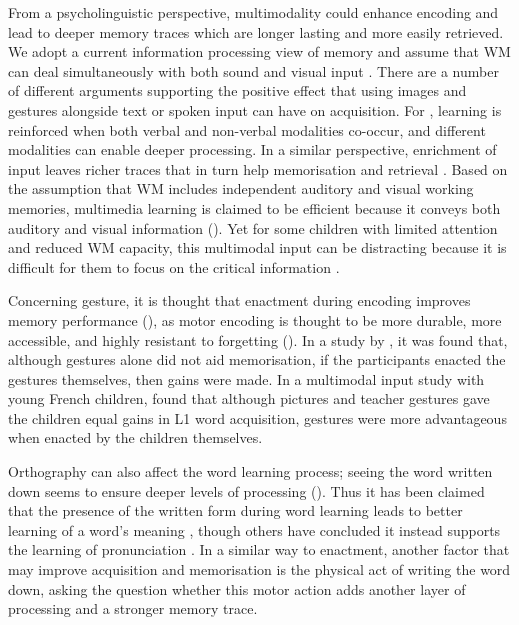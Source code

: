 \documentclass[output=paper]{langscibook}
\begin{document}
From a psycholinguistic perspective, multimodality could enhance encoding and lead to deeper memory traces which are longer lasting and more easily retrieved. We adopt a current information processing view of memory and assume that WM can deal simultaneously with both sound and visual input \citep{BaddeleyEtAl2015}. There are a number of different arguments supporting the positive effect that using images and gestures alongside text or spoken input can have on acquisition. For \citet{ClarkPaivio1991}, learning is reinforced when both verbal and non-verbal modalities co-occur, and different modalities can enable deeper processing. In a similar perspective, enrichment of input leaves richer traces that in turn help memorisation and retrieval \citep{Baddeley1997}. Based on the assumption that WM includes independent auditory and visual working memories, multimedia learning is claimed to be efficient because it conveys both auditory and visual information (\citealt{MorenoMayer2000}). Yet for some children with limited attention and reduced WM capacity, this multimodal input can be distracting because it is difficult for them to focus on the critical information \citep{MatuszEtAl2014}.

Concerning gesture, it is thought that enactment during encoding improves memory performance (\citealt[100]{Kormi-NouriNilsson2001}), as motor encoding is thought to be more durable, more accessible, and highly resistant to forgetting (\citealt[785]{KnopfNeidhardt1989}). In a study by \citet{MorettEtAl2012}, it was found that, although gestures alone did not aid memorisation, if the participants enacted the gestures themselves, then gains were made. In a multimodal input study with young French children, \citet{Tellier2008} found that although pictures and teacher gestures gave the children equal gains in L1 word acquisition, gestures were more advantageous when enacted by the children themselves. 

Orthography can also affect the word learning process; seeing the word written down seems to ensure deeper levels of processing (\citealt{CraikLockhart1972}). Thus it has been claimed that the presence of the written form during word learning leads to better learning of a word’s meaning \citep{RickettsEtAl2009}, though others have concluded it instead supports the learning of pronunciation \citep{KrepelEtAl2021}. In a similar way to enactment, another factor that may improve acquisition and memorisation is the physical act of writing the word down, asking the question whether this motor action adds another layer of processing and a stronger memory trace. 
\end{document}
